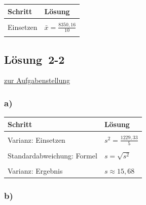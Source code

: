 \documentclass[
  11pt,
  ngerman,
  a4paper,
]{report}
\begin{document}
\begin{table}[H]
\centering
\begin{tabular}{l>{\raggedright\arraybackslash}p{8cm}}
\toprule
\textbf{Schritt} & \textbf{Lösung}\\
\midrule
\cellcolor{gray!6}{Formel} & \cellcolor{gray!6}{$\bar{x}=\frac{\sum\limits_{i=1}^{n}x_{i}}{n}$}\\
Einsetzen & $\bar{x}=\frac{8350{,}16}{10}$\\
\cellcolor{gray!6}{Ergebnis} & \cellcolor{gray!6}{$\bar{x}=835{,}02$}\\
\bottomrule
\end{tabular}
\end{table}

\hypertarget{loesung-2-2}{%
\subsection{Lösung~2-2}\label{loesung-2-2}}

\protect\hyperlink{aufgabe-2-2}{zur Aufgabenstellung}

\hypertarget{a-3}{%
\subsubsection{a)}\label{a-3}}

\begin{table}[H]
\centering
\begin{tabular}{>{\raggedright\arraybackslash}p{8cm}>{\raggedright\arraybackslash}p{8cm}}
\toprule
\textbf{Schritt} & \textbf{Lösung}\\
\midrule
\cellcolor{gray!6}{Varianz: Formel} & \cellcolor{gray!6}{$s^2=\frac{\sum\limits_{i=1}^{n}(x_{i}-\bar{x})^2}{n-1}$}\\
Varianz: Einsetzen & $s^2=\frac{1229{,}33}{5}$\\
\cellcolor{gray!6}{Varianz: Ergebnis} & \cellcolor{gray!6}{$s^2=245{,}87$}\\
Standardabweichung: Formel & $s=\sqrt{s^2}$\\
\cellcolor{gray!6}{Standardabweichung: Einsetzen} & \cellcolor{gray!6}{$s=\sqrt{245{,}87}$}\\
Varianz: Ergebnis & $s\approx15{,}68$\\
\bottomrule
\end{tabular}
\end{table}

\hypertarget{b-3}{%
\subsubsection{b)}\label{b-3}}
\end{document}
